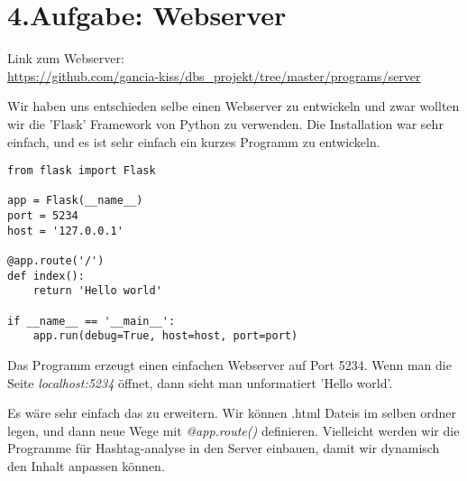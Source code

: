\section*{4.Aufgabe: Webserver}
Link zum Webserver: \\
\url{https://github.com/gancia-kiss/dbs_projekt/tree/master/programs/server}

Wir haben uns entschieden selbe einen Webserver zu entwickeln und zwar wollten wir die 'Flask' Framework von Python zu verwenden. Die Installation war sehr einfach, und es ist sehr einfach ein kurzes Programm zu entwickeln.

\begin{verbatim}
from flask import Flask

app = Flask(__name__)
port = 5234
host = '127.0.0.1'

@app.route('/')
def index():
    return 'Hello world'

if __name__ == '__main__':
    app.run(debug=True, host=host, port=port)
\end{verbatim}
Das Programm erzeugt einen einfachen Webserver auf Port 5234. Wenn man die Seite 
\textit{localhost:5234} öffnet, dann sieht man unformatiert 'Hello world'.

Es wäre sehr einfach das zu erweitern. Wir können .html Dateis im selben ordner legen, und dann neue Wege mit \textit{@app.route()} definieren. Vielleicht werden wir die Programme für Hashtag-analyse in den Server einbauen, damit wir dynamisch den Inhalt anpassen können.



